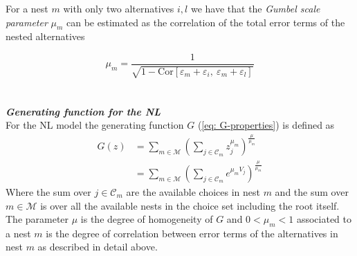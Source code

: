 For a nest $m$ with only two alternatives $i,l$ we have that the \textit{Gumbel scale parameter} $\mu_{m}$ can be estimated as the correlation of the total error terms of the nested alternatives \citep{cameron_microeconometrics:_2005}

  \begin{equation}
    \mu_{m}=\frac{1}{\sqrt{1-\textrm{Cor}[\varepsilon_{m}+\varepsilon_{i},\ \varepsilon_{m}+\varepsilon_{l}]}}
  \end{equation}
\\ \\
\noindent\textbf{\textit{Generating function for the NL}}\\
For the NL model the generating function $G$ (\ref{eq: G-properties}) is defined as \citep{bierlaire_theoretical_2006}
  \begin{equation}
  \begin{split} \label{eq: NL_gev}
    G(z)&=\sum\limits_{m\in\mathcal{M}}\left(\sum\limits_{j\in\mathcal{C}_m}z_j^{\mu_m}\right)^{\frac{\mu}{\mu_m}} \\
    &=\sum\limits_{m\in\mathcal{M}}\left(\sum\limits_{j\in\mathcal{C}_m}e^{\mu_m V_j}\right)^{\frac{\mu}{\mu_m}}
  \end{split}
  \end{equation}
Where the sum over $j\in\mathcal{C}_m$ are the available choices in nest $m$ and the sum over $m\in\mathcal{M}$ is over all the available nests in the choice set including the root itself. The parameter $\mu$ is the degree of homogeneity of $G$ and $0<\mu_m<1$ associated to a nest $m$ is the degree of correlation between error terms of the alternatives in nest $m$ as described in detail above.
\\ \\
